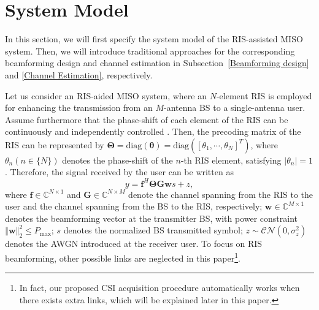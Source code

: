 \documentclass[journal,twocolumn]{IEEEtran}
\theoremstyle{nonumberplain}
\def \diag {\text{diag}}
\begin{document}
\section{System Model}  \label{System Model}
    In this section, we will first specify the system model of the RIS-assisted \ac{MISO} system.
    Then, we will introduce traditional approaches for the corresponding beamforming design and channel estimation in Subsection~\ref{Beamforming design} and \ref{Channel Estimation}, respectively.

    Let us consider an RIS-aided MISO system, where an $N$-element RIS is employed for enhancing the transmission from an $M$-antenna \ac{BS} to a single-antenna user. 
    Assume furthermore that the phase-shift of each element of the RIS can be continuously and independently controlled \cite{wu2019intelligent}. Then, the precoding matrix of the RIS can be represented by $\bm \Theta = \diag \left(\bm \theta\right )=\diag \left(\left[\theta_{1},\cdots ,\theta_{N}\right]^{T}\right)$,
    where $\theta_n (n\in \{N\})$ denotes the phase-shift of the $n$-th RIS element, satisfying $\lvert \theta_n\rvert=1$. Therefore, the signal received by the user can be written as 
        \begin{equation}
            \label{Signal model}
            y=\bm f^{H} \bm\Theta \bm G \bm w s+z,
        \end{equation}
        where $\bm f\in \mathbb C ^{N\times 1}$ and $\bm G \in \mathbb C^{N\times M}$ denote the channel spanning from the RIS to the user and the channel spanning from the BS to the RIS, respectively; $\bm w\in \mathbb C^{M\times 1}$ denotes the beamforming vector at the transmitter BS, with power constraint $\left\Vert \bm w\right \Vert_{2}^{2}\leq P_{\text{max}}$; $s$ denotes the normalized BS transmitted symbol; $z\sim \mathcal{CN}\left(0,\sigma_{z}^{2}\right)$ denotes the \ac{AWGN} introduced at the receiver user. To focus on RIS beamforming, other possible links are neglected in this paper\footnote{In fact, our proposed CSI acquisition procedure automatically works when there exists extra links, which will be explained later in this paper.}.
        
\end{document}
